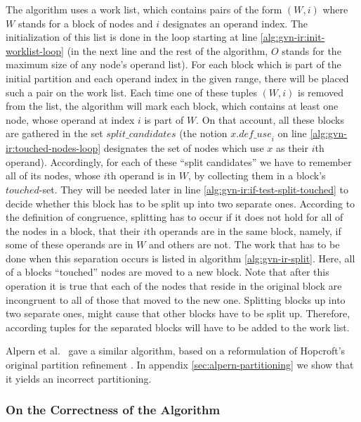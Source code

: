 The algorithm uses a work list, which contains pairs of the form $(W,i)$ where $W$ stands for a block of nodes and $i$ designates an operand index. The initialization of this list is done in the loop starting at line \ref{alg:gvn-ir:init-worklist-loop} (in the next line and the rest of the algorithm, $O$ stands for the maximum size of any node's operand list). For each block which is part of the initial partition and each operand index in the given range, there will be placed such a pair on the work list. Each time one of these tuples $(W,i)$ is removed from the list, the algorithm will mark each block, which contains at least one node, whose operand at index $i$ is part of $W$. On that account, all these blocks are gathered in the set $\mathit{split\_ candidates}$ (the notion $x.\mathit{def\_ use}_i$ on line \ref{alg:gvn-ir:touched-nodes-loop} designates the set of nodes which use $x$ as their $i$th operand). Accordingly, for each of these ``split candidates'' we have to remember all of its nodes, whose $i$th operand is in $W$, by collecting them in a block's $\mathit{touched}$-set. They will be needed later in line \ref{alg:gvn-ir:if-test-split-touched} to decide whether this block has to be split up into two separate ones. According to the definition of congruence, splitting has to occur if it does not hold for all of the nodes in a block, that their $i$th operands are in the same block, namely, if some of these operands are in $W$ and others are not. The work that has to be done when this separation occurs is listed in algorithm \ref{alg:gvn-ir-split}. Here, all of a blocks ``touched'' nodes are moved to a new block. Note that after this operation it is true that each of the nodes that reside in the original block are incongruent to all of those that moved to the new one. Splitting blocks up into two separate ones, might cause that other blocks have to be split up. Therefore, according tuples for the separated blocks will have to be added to the work list.

Alpern et al.\ \cite{alpern:1988:detecting-equality-of-variables} gave a similar algorithm, based on a reformulation of Hopcroft's original partition refinement \cite{aho:1974:the-design-and-analysis-of-computer-algorithms}. In appendix \ref{sec:alpern-partitioning} we show that it yields an incorrect partitioning.

\subsubsection*{On the Correctness of the Algorithm}


